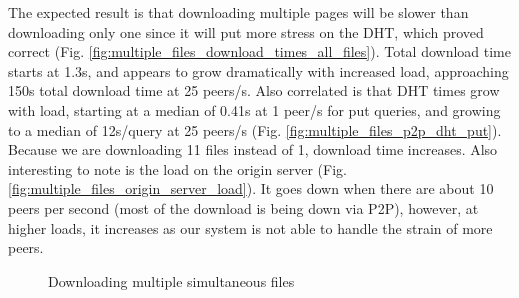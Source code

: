 The expected result is that downloading multiple pages will be slower than downloading only one since it will put more stress on the DHT, which proved correct (Fig. \ref{fig:multiple_files_download_times_all_files}).  Total download time starts at 1.3s, and appears to grow dramatically with increased load, approaching 150s total download time at 25 peers/s.  Also correlated is that DHT times grow with load, starting at a median of 0.41s at 1 peer/s for put queries, and growing to a median of 12s/query at 25 peers/s (Fig. \ref{fig:multiple_files_p2p_dht_put}).  Because we are downloading 11 files instead of 1, download time increases.  Also interesting to note is the load on the origin server (Fig. \ref{fig:multiple_files_origin_server_load}).  It goes down when there are about 10 peers per second (most of the download is being down via P2P), however, at higher loads, it increases as our system is not able to handle the strain of more peers.


\begin{figure}\begin{center} 
    \caption[]{Downloading multiple simultaneous files}
    \end{center}
    \end{figure}

